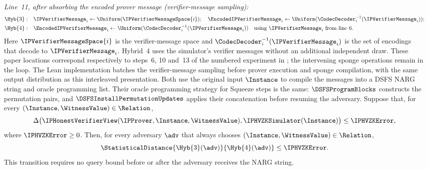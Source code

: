 \begin{lemma}
  \emph{Line~11, after absorbing the encoded prover message (verifier-message sampling):}
  \begin{equation*}
  \begin{aligned}
    \Hyb{3}:\quad &\IPVerifierMessage_i\leftarrow\Uniform(\IPVerifierMessageSpace{i});\quad
      \EncodedIPVerifierMessage_i\leftarrow\Uniform(\CodecDecoder_i^{-1}(\IPVerifierMessage_i));\\
    \Hyb{4}:\quad &\EncodedIPVerifierMessage_i\leftarrow\Uniform(\CodecDecoder_i^{-1}(\IPVerifierMessage_i))
      \quad\text{using }\IPVerifierMessage_i\text{ from line~6}.
  \end{aligned}
  \end{equation*}
  Here \(\IPVerifierMessageSpace{i}\) is the verifier-message space and \(\CodecDecoder_i^{-1}(\IPVerifierMessage_i)\) is the set of encodings that decode to \(\IPVerifierMessage_i\). Hybrid~4 uses the simulator's verifier messages without an additional independent draw. These paper locations correspond respectively to steps~6, 10 and~13 of the numbered experiment in ; the intervening sponge operations remain in the loop. The Lean implementation batches the verifier-message sampling before prover execution and sponge compilation, with the same output distribution as this interleaved presentation. Both use the original input \(\Instance\) to compile the messages into a DSFS NARG string and oracle programming list. Their oracle programming strategy for Squeeze steps is the same: \(\DSFSProgramBlocks\) constructs the permutation pairs, and \(\DSFSInstallPermutationUpdates\) applies their concatenation before resuming the adversary. Suppose that, for every \((\Instance,\WitnessValue)\in\Relation\),
  \begin{equation*}
    \Delta\bigl(\IPHonestVerifierView(\IPProver,\Instance,\WitnessValue),
      \IPHVZKSimulator(\Instance)\bigr)
      \le \IPHVZKError,
  \end{equation*}
  where \(\IPHVZKError\ge0\). Then, for every adversary \(\adv\) that always chooses \((\Instance,\WitnessValue)\in\Relation\),
  \begin{equation*}
    \StatisticalDistance{\Hyb{3}(\adv)}{\Hyb{4}(\adv)}
      \leq \IPHVZKError.
  \end{equation*}
  This transition requires no query bound before or after the adversary receives the NARG string.
  \leanok
\end{lemma}
